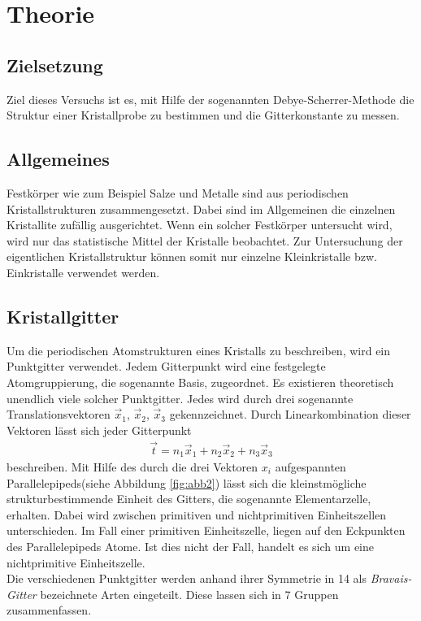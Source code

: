 \section{Theorie}
\label{sec:Theorie}

\subsection{Zielsetzung}
\label{subsec:Zielsetzung}
Ziel dieses Versuchs ist es, mit Hilfe der sogenannten
Debye-Scherrer-Methode die Struktur einer Kristallprobe
zu bestimmen und die Gitterkonstante zu messen.

\subsection{Allgemeines}
\label{subsec:allgemein}

Festkörper wie zum Beispiel Salze und Metalle
sind aus periodischen
Kristallstrukturen zusammengesetzt. Dabei sind im
Allgemeinen die einzelnen Kristallite zufällig
ausgerichtet. Wenn ein solcher Festkörper untersucht wird,
wird nur das statistische Mittel der Kristalle beobachtet.
Zur Untersuchung der eigentlichen Kristallstruktur
können somit nur einzelne Kleinkristalle bzw.
Einkristalle verwendet werden.

\subsection{Kristallgitter}
\label{subsec:kristallstrukturen}
Um die periodischen Atomstrukturen eines Kristalls
zu beschreiben, wird ein Punktgitter verwendet.
Jedem Gitterpunkt wird eine festgelegte Atomgruppierung,
die sogenannte Basis, zugeordnet.
Es existieren theoretisch unendlich viele solcher Punktgitter.
Jedes wird durch drei sogenannte Translationsvektoren
$\vec{x}_{1}$, $\vec{x}_{2}$, $\vec{x}_{3}$ gekennzeichnet.
Durch Linearkombination dieser Vektoren lässt sich
jeder Gitterpunkt
\begin{align}
\label{eqn:1*}
\vec{t} = n_{1} \vec{x}_{1} + n_{2} \vec{x}_{2} + n_{3} \vec{x}_{3}
\end{align}
beschreiben.
Mit Hilfe des durch die drei Vektoren $x_{i}$ aufgespannten
Parallelepipeds(siehe Abbildung \ref{fig:abb2}) lässt sich die
kleinstmögliche strukturbestimmende Einheit des Gitters,
die sogenannte Elementarzelle, erhalten.
Dabei wird zwischen primitiven und nichtprimitiven Einheitszellen
unterschieden. Im Fall einer primitiven Einheitszelle,
liegen auf den Eckpunkten des Parallelepipeds Atome.
Ist dies nicht der Fall, handelt es sich um eine
nichtprimitive Einheitszelle.\\
Die verschiedenen Punktgitter werden anhand ihrer Symmetrie
in 14 als \textit{Bravais-Gitter} bezeichnete Arten eingeteilt.
Diese lassen sich in 7 Gruppen zusammenfassen.

